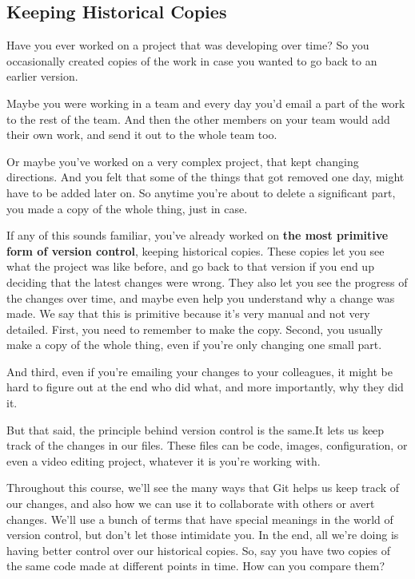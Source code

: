 	\subsection{Keeping Historical Copies}
	
	Have you ever worked on a project that was developing over time? So you occasionally created copies of the work in case you wanted to go back to an earlier version.
	
	Maybe you were working in a team and every day you'd email a part of the work to the rest of the team. And then the other members on your team would add their own work, and send it out to the whole team too.

	Or maybe you've worked on a very complex project, that kept changing directions. And you felt that some of the things that got removed one day, might have to be added later on. So anytime you're about to delete a significant part, you made a copy of the whole thing, just in case.
	
	If any of this sounds familiar, you've already worked on \textbf{the most primitive form of version control}, keeping historical copies. These copies let you see what the project was like before, and go back to that version if you end up deciding that the latest changes were wrong. They also let you see the progress of the changes over time, and maybe even help you understand why a change was made. We say that this is primitive because it's very manual and not very detailed. First, you need to remember to make the copy. Second, you usually make a copy of the whole thing, even if you're only changing one small part.
	
	And third, even if you're emailing your changes to your colleagues, it might be hard to figure out at the end who did what, and more importantly, why they did it. 

	But that said, the principle behind version control is the same.It lets us keep track of the changes in our files. These files can be code, images, configuration, or even a video editing project, whatever it is you're working with. 
	
	Throughout this course, we'll see the many ways that Git helps us keep track of our changes, and also how we can use it to collaborate with others or avert changes. We'll use a bunch of terms that have special meanings in the world of version control, but don't let those intimidate you. In the end, all we're doing is having better control over our historical copies. So, say you have two copies of the same code made at different points in time. How can you compare them?	
	
